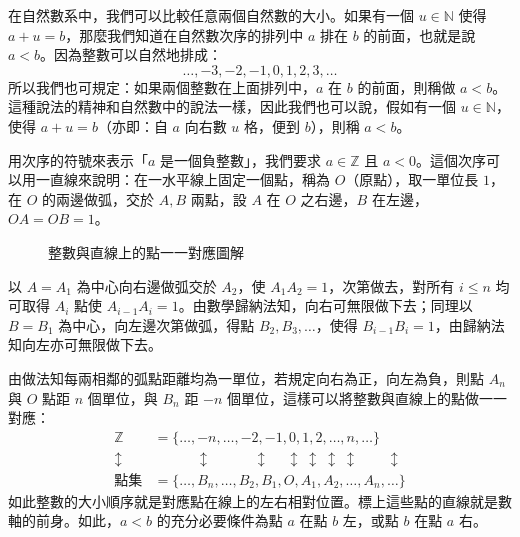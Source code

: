 在自然數系中，我們可以比較任意兩個自然數的大小。如果有一個 $u \in \mathbb{N}$ 使得 $a+u=b$，那麼我們知道在自然數次序的排列中 $a$ 排在 $b$ 的前面，也就是說 $a < b$。因為整數可以自然地排成：
\begin{equation*}
  \dots, -3, -2, -1, 0, 1, 2, 3, \dots
\end{equation*}
所以我們也可規定：如果兩個整數在上面排列中，$a$ 在 $b$ 的前面，則稱做 $a < b$。這種說法的精神和自然數中的說法一樣，因此我們也可以說，假如有一個 $u \in \mathbb{N}$，使得 $a+u=b$（亦即：自 $a$ 向右數 $u$ 格，便到 $b$），則稱 $a < b$。

用次序的符號來表示「$a$ 是一個負整數」，我們要求 $a \in \mathbb{Z}$ 且 $a < 0$。這個次序可以用一直線來說明：在一水平線上固定一個點，稱為 $O$（原點），取一單位長 $1$，在 $O$ 的兩邊做弧，交於 $A, B$ 兩點，設 $A$ 在 $O$ 之右邊，$B$ 在左邊，$OA = OB = 1$。

\begin{figure}[htbp]
\centering
{}
\caption{整數與直線上的點一一對應圖解}\label{fig:int_line_corr}
\end{figure}

以 $A = A_1$ 為中心向右邊做弧交於 $A_2$，使 $A_1 A_2 = 1$，次第做去，對所有 $i \le n$ 均可取得 $A_i$ 點使 $A_{i-1} A_i = 1$。由數學歸納法知，向右可無限做下去；同理以 $B = B_1$ 為中心，向左邊次第做弧，得點 $B_2, B_3, \dots$，使得 $B_{i-1} B_i = 1$，由歸納法知向左亦可無限做下去。

由做法知每兩相鄰的弧點距離均為一單位，若規定向右為正，向左為負，則點 $A_n$ 與 $O$ 點距 $n$ 個單位，與 $B_n$ 距 $-n$ 個單位，這樣可以將整數與直線上的點做一一對應：
\begin{align*}
  \mathbb{Z} &= \{\dots, -n, \dots, -2, -1, 0, 1, 2, \dots, n, \dots\} \\
  \updownarrow \quad & \qquad\quad \updownarrow \quad\qquad \updownarrow \quad\ \updownarrow \ \updownarrow \ \updownarrow \ \updownarrow \qquad \updownarrow \\
  \text{點集} &= \{\dots, B_n, \dots, B_2, B_1, O, A_1, A_2, \dots, A_n, \dots\}
\end{align*}
如此整數的大小順序就是對應點在線上的左右相對位置。標上這些點的直線就是數軸的前身。如此，$a < b$ 的充分必要條件為點 $a$ 在點 $b$ 左，或點 $b$ 在點 $a$ 右。

